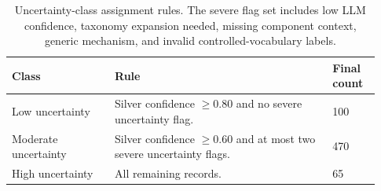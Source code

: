 \begin{table}[t]
\centering
\small
\caption{Uncertainty-class assignment rules. The severe flag set includes low LLM confidence, taxonomy expansion needed, missing component context, generic mechanism, and invalid controlled-vocabulary labels.}
\label{tab:uncertainty_classes}
\begin{tabular}{p{0.26\linewidth}p{0.55\linewidth}p{0.12\linewidth}}
\toprule
Class & Rule & Final count \\
\midrule
Low uncertainty & Silver confidence $\geq 0.80$ and no severe uncertainty flag. & 100 \\
Moderate uncertainty & Silver confidence $\geq 0.60$ and at most two severe uncertainty flags. & 470 \\
High uncertainty & All remaining records. & 65 \\
\bottomrule
\end{tabular}
\end{table}
